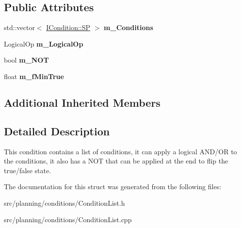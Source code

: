 \subsection*{Public Attributes}
\begin{DoxyCompactItemize}
\item 
\mbox{\label{struct_condition_list_a28d6f9b198ee583fe7ebb821e9173114}} 
std\+::vector$<$ \hyperlink{class_i_condition_a9e52c5b905c336e61daf97bc3f10def8}{I\+Condition\+::\+SP} $>$ {\bfseries m\+\_\+\+Conditions}
\item 
\mbox{\label{struct_condition_list_aaa511e8de44c802040b4346ae86dc0d5}} 
Logical\+Op {\bfseries m\+\_\+\+Logical\+Op}
\item 
\mbox{\label{struct_condition_list_aaf4d5d3cd39ec464341c1b752f5e3411}} 
bool {\bfseries m\+\_\+\+N\+OT}
\item 
\mbox{\label{struct_condition_list_a9b14c5cddb657a37e5c86ff5c7500d16}} 
float {\bfseries m\+\_\+f\+Min\+True}
\end{DoxyCompactItemize}
\subsection*{Additional Inherited Members}


\subsection{Detailed Description}
This condition contains a list of conditions, it can apply a logical A\+N\+D/\+OR to the conditions, it also has a N\+OT that can be applied at the end to flip the true/false state. 

The documentation for this struct was generated from the following files\+:\begin{DoxyCompactItemize}
\item 
src/planning/conditions/Condition\+List.\+h\item 
src/planning/conditions/Condition\+List.\+cpp\end{DoxyCompactItemize}
